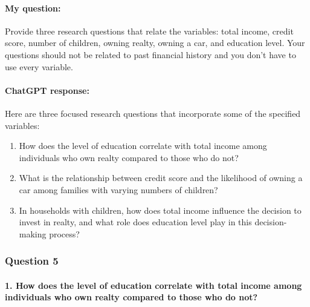 \documentclass[
]{article}
\begin{document}
\hypertarget{my-question}{%
\paragraph{My question:}\label{my-question}}

Provide three research questions that relate the variables: total
income, credit score, number of children, owning realty, owning a car,
and education level. Your questions should not be related to past
financial history and you don't have to use every variable.

\hypertarget{chatgpt-response}{%
\paragraph{ChatGPT response:}\label{chatgpt-response}}

Here are three focused research questions that incorporate some of the
specified variables:

\begin{enumerate}
\def\labelenumi{\arabic{enumi}.}
\item
  How does the level of education correlate with total income among
  individuals who own realty compared to those who do not?
\item
  What is the relationship between credit score and the likelihood of
  owning a car among families with varying numbers of children?
\item
  In households with children, how does total income influence the
  decision to invest in realty, and what role does education level play
  in this decision-making process?
\end{enumerate}

\hypertarget{question-5}{%
\subsubsection{Question 5}\label{question-5}}

\hypertarget{how-does-the-level-of-education-correlate-with-total-income-among-individuals-who-own-realty-compared-to-those-who-do-not}{%
\paragraph{1. How does the level of education correlate with total
income among individuals who own realty compared to those who do
not?}\label{how-does-the-level-of-education-correlate-with-total-income-among-individuals-who-own-realty-compared-to-those-who-do-not}}
\end{document}
